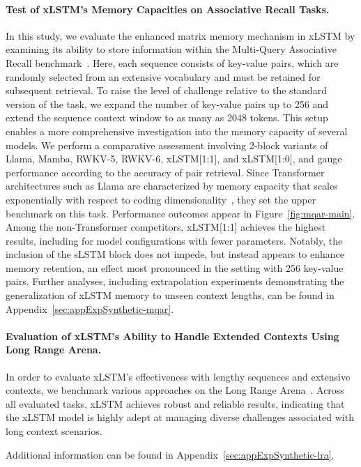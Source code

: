 \paragraph{Test of xLSTM's Memory Capacities on Associative Recall Tasks.} In this study, we evaluate the enhanced matrix memory mechanism in xLSTM by examining its ability to store information within the Multi-Query Associative Recall benchmark~\citep{Arora:23arxiv}. Here, each sequence consists of key-value pairs, which are randomly selected from an extensive vocabulary and must be retained for subsequent retrieval. To raise the level of challenge relative to the standard version of the task, we expand the number of key-value pairs up to 256 and extend the sequence context window to as many as 2048 tokens. This setup enables a more comprehensive investigation into the memory capacity of several models. We perform a comparative assessment involving 2-block variants of Llama, Mamba, RWKV-5, RWKV-6, xLSTM[1:1], and xLSTM[1:0], and gauge performance according to the accuracy of pair retrieval. Since Transformer architectures such as Llama are characterized by memory capacity that scales exponentially with respect to coding dimensionality~\citep{Ramsauer:21}, they set the upper benchmark on this task. Performance outcomes appear in Figure~\ref{fig:mqar-main}. Among the non-Transformer competitors, xLSTM[1:1] achieves the highest results, including for model configurations with fewer parameters. Notably, the inclusion of the sLSTM block does not impede, but instead appears to enhance memory retention, an effect most pronounced in the setting with 256 key-value pairs. Further analyses, including extrapolation experiments demonstrating the generalization of xLSTM memory to unseen context lengths, can be found in Appendix~\ref{sec:appExpSynthetic-mqar}.

\paragraph{Evaluation of xLSTM's Ability to Handle Extended Contexts Using Long Range Arena.} In order to evaluate xLSTM's effectiveness with lengthy sequences and extensive contexts, we benchmark various approaches on the Long Range Arena~\citep{Tay:21}. Across all evaluated tasks, xLSTM achieves robust and reliable results, indicating that the xLSTM model is highly adept at managing diverse challenges associated with long context scenarios.

Additional information can be found in Appendix~\ref{sec:appExpSynthetic-lra}.

